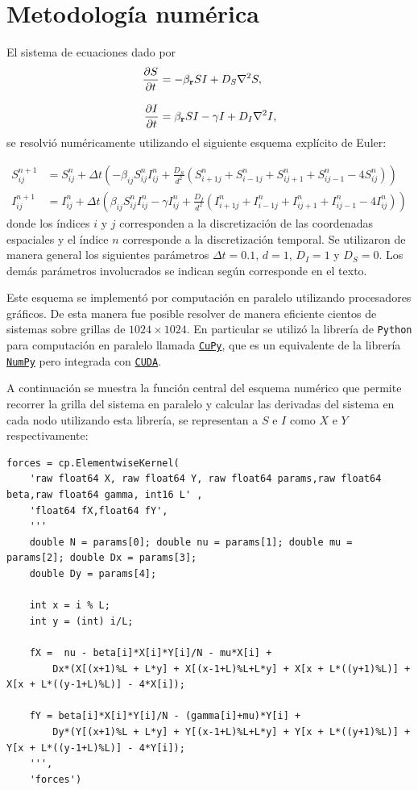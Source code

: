 \chapter{Metodología numérica}
\label{C:ap1}
\graphicspath{{figs/}}


El sistema de ecuaciones dado por
\begin{align*}
    \pdv{S}{t}&=-\beta_{\vb{r}} SI + D_{S} \laplacian{S},\\[.3cm]
    \pdv{I}{t}&=\beta_{\vb{r}} SI - \gamma I + D_{I} \laplacian{I},
\end{align*}
se resolvió numéricamente utilizando el siguiente esquema explícito de Euler:

\begin{align*}
    S^{n+1}_{ij} &= S^n_{ij} + \Delta t\left( -\beta_{ij} S^n_{ij}I^n_{ij} + \frac{D_{S}}{d^2} (S^n_{i+1j}+S^n_{i-1j}+S^n_{ij+1}+S^n_{ij-1}-4S^n_{ij})\right)\\[.3cm]
    I^{n+1}_{ij} &= I^n_{ij} + \Delta t\left( \beta_{ij} S^n_{ij}I^n_{ij} - \gamma I^n_{ij} + \frac{D_{I}}{d^2} (I^n_{i+1j}+I^n_{i-1j}+I^n_{ij+1}+I^n_{ij-1}-4I^n_{ij})\right) 
\end{align*}
donde los índices $i$ y $j$ corresponden a la discretización de las coordenadas espaciales y el índice $n$ corresponde a la discretización temporal.
Se utilizaron de manera general los siguientes parámetros $\Delta t=0.1$, $d=1$, $D_{I}=1$ y $D_{S}=0$. Los demás parámetros involucrados se indican 
según corresponde en el texto.

Este esquema se implementó por computación en paralelo utilizando procesadores gráficos. De esta manera fue posible resolver de manera eficiente cientos de sistemas 
sobre grillas de $1024\times1024$. En particular se utilizó la librería de \texttt{Python} para computación en paralelo llamada \texttt{\href{https://cupy.dev/}{CuPy}},
que es un equivalente de la librería \texttt{\href{https://numpy.org/}{NumPy}} pero integrada con \texttt{\href{https://developer.nvidia.com/cuda-toolkit}{CUDA}}.

A continuación se muestra la función central del esquema numérico que permite recorrer la grilla del sistema en paralelo y calcular las derivadas del sistema en 
cada nodo utilizando esta librería, se representan a $S$ e $I$ como $X$ e $Y$ respectivamente:\newpage

\begin{lstlisting}[basicstyle=\tiny]
    forces = cp.ElementwiseKernel(
    'raw float64 X, raw float64 Y, raw float64 params,raw float64 beta,raw float64 gamma, int16 L' ,
    'float64 fX,float64 fY',
    '''
    double N = params[0]; double nu = params[1]; double mu = params[2]; double Dx = params[3];
    double Dy = params[4];
    
    int x = i % L;
    int y = (int) i/L;

    fX =  nu - beta[i]*X[i]*Y[i]/N - mu*X[i] + 
        Dx*(X[(x+1)%L + L*y] + X[(x-1+L)%L+L*y] + X[x + L*((y+1)%L)] + X[x + L*((y-1+L)%L)] - 4*X[i]);

    fY = beta[i]*X[i]*Y[i]/N - (gamma[i]+mu)*Y[i] + 
        Dy*(Y[(x+1)%L + L*y] + Y[(x-1+L)%L+L*y] + Y[x + L*((y+1)%L)] + Y[x + L*((y-1+L)%L)] - 4*Y[i]);
    ''',
    'forces')
\end{lstlisting}

